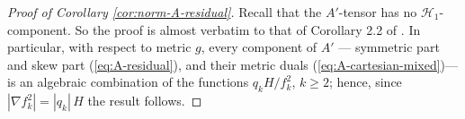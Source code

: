 \documentclass[11pt]{amsart}
\theoremstyle{plain}
\numberwithin{equation}{section}
\theoremstyle{definition}
\theoremstyle{remark}
\begin{document}
\begin{proof}[Proof of Corollary \ref{cor:norm-A-residual}]
	Recall that the $A'$-tensor has no $\mathcal{H}_1$-component. So the proof is almost verbatim to that of Corollary 2.2 of \cite{FT}. In particular, with respect to metric $g$, every component of $A'$ --- symmetric part and skew part (\ref{eq:A-residual}), and their metric duals (\ref{eq:A-cartesian-mixed})--- is an algebraic combination of the functions $q_k H / f_k^2$, $k \geq 2$; hence, since $| \nabla f_k^2 | = | q_k |\, H$ the result follows.
	
	
\end{proof}



\end{document}
